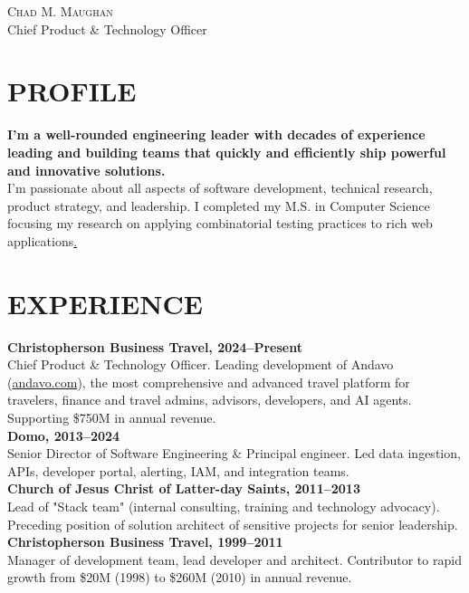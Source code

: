 \documentclass[letterpaper]{article}
\def\name{Chad M. Maughan}								    %
\newcommand{\egg}[1]{\href{https://chadmaughan.com/hello}{#1}}
\begin{document}
\begin{minipage}[t]{4.25in}

{\huge\scshape \name}
\smallskip\\
{\large Chief Product \& Technology Officer}

\vspace{0.02in}

\section*{PROFILE}
{\bfseries I'm a well-rounded engineering leader with decades of experience leading and building teams that quickly and efficiently ship powerful and innovative solutions.} \\

I'm passionate about all aspects of software development, technical research, product strategy, and leadership. I completed my M.S. in Computer Science focusing my research on applying combinatorial testing practices to rich web applications\egg{.}
\section*{EXPERIENCE}

{\bfseries Christopherson Business Travel, 2024--Present} \smallskip\\
Chief Product \& Technology Officer. Leading development of Andavo (\href{https://andavo.com}{andavo.com}), the most comprehensive and advanced travel platform for travelers, finance and travel admins, advisors, developers, and AI agents. Supporting \$750M in annual revenue.\smallskip\\

{\bfseries Domo, 2013--2024} \smallskip\\
Senior Director of Software Engineering \& Principal engineer. Led data ingestion, APIs, developer portal, alerting, IAM, and integration teams.\smallskip\\

{\bfseries Church of Jesus Christ of Latter-day Saints, 2011--2013} \smallskip\\
Lead of "Stack team" (internal consulting, training and technology advocacy). Preceding position of solution architect of sensitive projects for senior leadership.\smallskip\\

{\bfseries Christopherson Business Travel, 1999--2011} \smallskip\\	
Manager of development team, lead developer and architect. Contributor to rapid growth from \$20M (1998) to \$260M (2010) in annual revenue.



\end{minipage}
\end{document}
